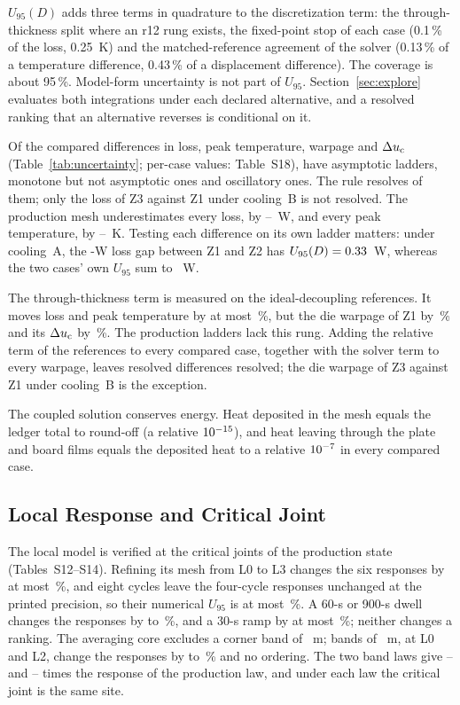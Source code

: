 $U_{95}(D)$ adds three terms in quadrature to the discretization term: the through-thickness
split where an r12 rung exists, the fixed-point stop of each case (0.1\,\% of the loss,
0.25~K) and the matched-reference agreement of the solver (0.13\,\% of a temperature
difference, 0.43\,\% of a displacement difference). The coverage is about 95\,\%. Model-form
uncertainty is not part of $U_{95}$. Section~\ref{sec:explore} evaluates both integrations under
each declared alternative, and a resolved ranking that an alternative reverses is conditional on
it.

Of the \MthNcomp{} compared differences in loss, peak temperature, warpage and $\Delta u_{\mathrm{c}}$
(Table~\ref{tab:uncertainty}; per-case values: Table~S18), \MthNasymWord{} have asymptotic ladders,
\MthNnotasym{} monotone but not asymptotic ones and \MthNoscWord{} oscillatory ones. The rule resolves
\MthNresolved{} of them; only the loss of Z3 against Z1 under cooling~B is not resolved. The
production mesh underestimates every loss, by \MthBiasPLo--\MthBiasPHi~W, and every peak
temperature, by \MthBiasTLo--\MthBiasTHi~K. Testing each difference on its own ladder matters:
under cooling~A, the \GapAZtwo-W loss gap between Z1 and Z2 has $U_{95}(D) =
0.33$~W, whereas the two cases' own $U_{95}$ sum to \MthGapAPlossSum~W.

The through-thickness term is measured on the ideal-decoupling references. It moves loss and
peak temperature by at most \MthTtTZone\,\%, but the die warpage of Z1 by \MthTtWarpZone\,\% and
its $\Delta u_{\mathrm{c}}$ by \MthTtDuZone\,\%. The production ladders lack this rung. Adding the relative term of
the references to every compared case, together with the solver term to every warpage, leaves
\MthTtHold{} resolved differences resolved; the die warpage of Z3 against Z1 under cooling~B is the
exception.

The coupled solution conserves energy. Heat deposited in the mesh equals the ledger total to
round-off (a relative $10^{-15}$), and heat leaving through the plate and board films
equals the deposited heat to a relative $10^{-7}$ in every compared case.

\subsection{Local Response and Critical Joint}\label{sec:verif-local}
The local model is verified at the critical joints of the production state (Tables~S12--S14).
Refining its mesh from L0 to L3 changes the six responses by at most \MvMeshUmax\,\%, and eight
cycles leave the four-cycle responses unchanged at the printed precision, so their numerical
$U_{95}$ is at most \MvMeshUmax\,\%. A 60-s or 900-s dwell changes the responses by
\MvDwellSixtyLo{} to \MvDwellNineHundredHi\,\%, and a 30-s ramp by at most \MvRampThirtyHi\,\%;
neither changes a ranking. The averaging core excludes a corner band of
\MthBandProdUm~\textmu m; bands of \MthBandUm~\textmu m, at L0 and L2, change the responses by
\MthBandLo{} to \MthBandHi\,\% and no ordering. The two band laws give
\MvRatioXiaoLo--\MvRatioXiaoHi{} and \MvRatioMeasLo--\MvRatioMeasHi{} times the response of the
production law, and under each law the critical joint is the same site.

